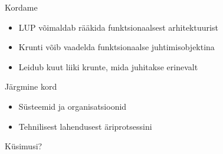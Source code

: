 \documentclass{beamer}
\begin{document}
\begin{frame}{Kordame}
	\begin{itemize}
		\item LUP võimaldab rääkida funktsionaalsest arhitektuurist
		\item Krunti võib vaadelda funktsionaalse juhtimisobjektina
		\item Leidub kuut liiki krunte, mida juhitakse erinevalt
	\end{itemize}
\end{frame}

\begin{frame}{Järgmine kord}
\begin{itemize}
	\item Süsteemid ja organisatsioonid
	\item Tehnilisest lahendusest äriprotsessini
	\end{itemize}
\end{frame}

%	
%	

\begin{frame}[standout]
Küsimusi?
\end{frame}
\end{document}
